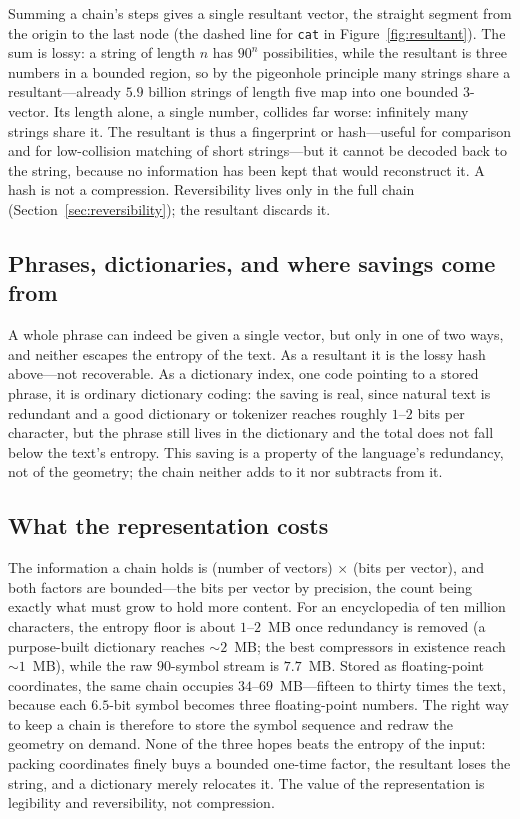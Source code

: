 \documentclass[11pt]{article}
\begin{document}
Summing a chain's steps gives a single resultant vector, the straight segment from the origin
to the last node (the dashed line for \texttt{cat} in Figure~\ref{fig:resultant}). The sum is
lossy: a string of length $n$ has $90^n$ possibilities, while the resultant is three numbers
in a bounded region, so by the pigeonhole principle many strings share a resultant---already
$5.9$ billion strings of length five map into one bounded 3-vector. Its length alone, a single
number, collides far worse: infinitely many strings share it. The resultant is thus a
fingerprint or hash---useful for comparison and for low-collision matching of short
strings---but it cannot be decoded back to the string, because no information has been kept
that would reconstruct it. A hash is not a compression. Reversibility lives only in the full
chain (Section~\ref{sec:reversibility}); the resultant discards it.

\subsection{Phrases, dictionaries, and where savings come from}

A whole phrase can indeed be given a single vector, but only in one of two ways, and neither
escapes the entropy of the text. As a resultant it is the lossy hash above---not recoverable.
As a dictionary index, one code pointing to a stored phrase, it is ordinary dictionary coding:
the saving is real, since natural text is redundant and a good dictionary or tokenizer reaches
roughly $1$--$2$ bits per character, but the phrase still lives in the dictionary and the
total does not fall below the text's entropy. This saving is a property of the language's
redundancy, not of the geometry; the chain neither adds to it nor subtracts from it.

\subsection{What the representation costs}

The information a chain holds is (number of vectors) $\times$ (bits per vector), and both
factors are bounded---the bits per vector by precision, the count being exactly what must grow
to hold more content. For an encyclopedia of ten million characters, the entropy floor is
about $1$--$2$~MB once redundancy is removed (a purpose-built dictionary reaches
$\sim 2$~MB; the best compressors in existence reach $\sim 1$~MB), while the raw $90$-symbol
stream is $7.7$~MB. Stored as floating-point coordinates, the same chain occupies
$34$--$69$~MB---fifteen to thirty times the text, because each $6.5$-bit symbol becomes three
floating-point numbers. The right way to keep a chain is therefore to store the symbol
sequence and redraw the geometry on demand. None of the three hopes beats the entropy of the
input: packing coordinates finely buys a bounded one-time factor, the resultant loses the
string, and a dictionary merely relocates it. The value of the representation is legibility
and reversibility, not compression.
\end{document}

